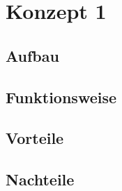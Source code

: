 \section{Konzept 1}

\subsection{Aufbau}

\subsection{Funktionsweise}

\subsection{Vorteile}

\subsection{Nachteile}

